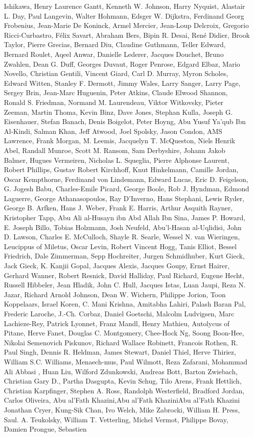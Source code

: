 \begin{spacing}{0.5}
\begin{tiny}
Ishikawa, Henry Laurence Gantt, Kenneth W. Johnson, Harry Nyquist, Alastair L. Day, Paul Langevin, Walter Hohmann, Edsger W. Dijkstra, Ferdinand Georg Frobenius, Jean-Marie De Koninck, Armel Mercier, Jean-Loup Delcroix, Gregorio Ricci-Curbastro, Félix Savart, Abraham Bers, Bipin R. Desai, René Didier, Brook Taylor, Pierre Grecias, Bernard Diu, Claudine Guthmann, Teller Edward, Bernard Roulet, Aqeel Anwar, Danielle Lederer, Jacques Douchet, Bruno Zwahlen, Dean G. Duff, Georges Duvaut, Roger Penrose, Edgard Elbaz, Mario Novello, Christian Gentili, Vincent Giard, Carl D. Murray, Myron Scholes, Edward Witten, Stanley F. Dermott, Jimmy Wales, Larry Sanger, Larry Page, Sergey Brin, Jean-Marc Huguenin, Peter Atkins, Claude Elwood Shannon, Ronald S. Friedman, Normand M. Laurendeau, Viktor Witkovsky, Pieter Zeeman, Martin Thoma, Kevin Binz, Dave Jones, Stephan Kulla, Joseph G. Eisenhauer, Stefan Banach, Denis Boigelot, Peter Hoyng, Abu Yusuf Ya'qub Ibn Al-Kindi, Salman Khan, Jeff Atwood, Joel Spolsky, Jason Condon, AMS Lawrence, Frank Morgan, M. Leemis, Jacquelyn T. McQueston, Niels Henrik Abel, Randall Munroe, Scott M. Ransom, Sam Derbyshire, Johann Jakob Balmer, Hugues Vermeiren, Nicholas L. Squeglia, Pierre Alphonse Laurent, Robert Phillips, Gustav Robert Kirchhoff, Knut Hinkelmann, Camille Jordan, Oscar Kempthorne, Ferdinand von Lindemann, Edward Lucas, Eric D. Feigelson, G. Jogesh Babu, Charles-Emile Picard, George Boole, Rob J. Hyndman, Edmond Laguerre, George Athanasopoulos, Ray D'Inverno, Hans Stephani, Lewis Ryder, George B. Arfken, Hans J. Weber, Frank E. Harris, Arthur Asquith Rayner, Kristopher Tapp, Abu Ali al-Husayn ibn Abd Allah Ibn Sina, James P. Howard, E. Joseph Billo, Tobias Holzmann, Josh Neufeld, Abu'l-Hasan al-Uqlidisi, John D. Lawson, Charles E. McCulloch, Shayle R. Searle, Wessel N. van Wieringen, Leucippus of Miletus, Oscar Levin, Robert Vincent Hogg, Tanis Elliot, Bessel Friedrich, Dale Zimmerman, Sepp Hochreiter, Jurgen Schmidhuber, Kurt Gieck, Jack Gieck, K. Kanjii Gopal, Jacques Alexis, Jacques Goupy, Ernst Hairer, Gerhard Wanner, Robert Resnick, David Halliday, Paul Richard, Eugene Hecht, Russell Hibbeler, Jean Hladik, John C. Hull, Jacques Istas, Luan Jaupi, Reza N. Jazar, Richard Arnold Johnson, Dean W. Wichern, Philippe Jorion, Toon Koppelaars, Israel Koren, C. Mani Krishna, Amitabha Lahiri, Palash Baran Pal, Frederic Laroche, J.-Ch. Corbaz, Daniel Goetschi, Malcolm Ludvigsen, Marc Lachieze-Rey, Patrick Lyonnet, Franz Mandl, Henry Mathieu, Autolycus of Pitane, Herve Fanet, Douglas C. Montgomery, Chee-Hock Ng, Soong Boon-Hee, Nikolai Semenovich Piskunov, Richard Wallace Robinett, Francois Rothen, R. Paul Singh, Dennis R. Heldman, James Stewart, Daniel Thiel, Herve Thiriez, William S.C. Williams, Menaech-mus, Paul Wilmott, Reza Zafarani, Mohammad Ali Abbasi , Huan Liu, Wilford Zdunkowski, Andreas Bott, Barton Zwiebach, Christian Gary D., Partha Dasgupta, Kevin Schug, Tilo Arens, Frank Hettlich, Christian Karpfinger, Stephen A. Ross, Randolph Westerfield, Bradford Jordan, Carlos Oliveira, Abu al'Fath Khazini,Abu al'Fath KhaziniAbu al'Fath Khazini Jonathan Cryer, Kung-Sik Chan, Ivo Welch, Mike Zabrocki, William H. Press, Saul. A. Teukolsky, William T. Vetterling, Michel Vermot, Philippe Bovay, Damien Prongue, Sebastien 
\end{tiny}
\end{spacing}
